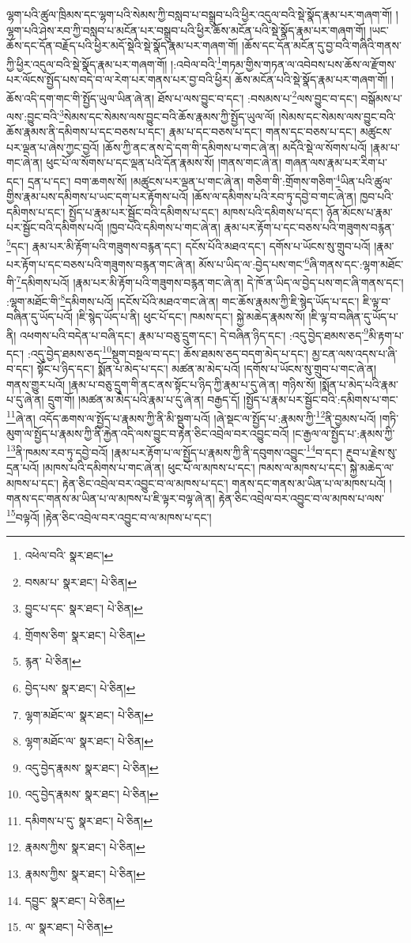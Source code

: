 ལྷག་པའི་ཚུལ་ཁྲིམས་དང་ལྷག་པའི་སེམས་ཀྱི་བསླབ་པ་བསྒྲུབ་པའི་ཕྱིར་འདུལ་བའི་སྡེ་སྣོད་རྣམ་པར་གཞག་གོ། །ལྷག་པའི་ཤེས་རབ་ཀྱི་བསླབ་པ་མངོན་པར་བསྒྲུབ་པའི་ཕྱིར་ཆོས་མངོན་པའི་སྡེ་སྣོད་རྣམ་པར་གཞག་གོ། །ཡང་ཆོས་དང་དོན་བརྗོད་པའི་ཕྱིར་མདོ་སྡེའི་སྡེ་སྣོད་རྣམ་པར་གཞག་གོ། །ཆོས་དང་དོན་མངོན་དུ་བྱ་བའི་གཞིའི་གནས་ཀྱི་ཕྱིར་འདུལ་བའི་སྡེ་སྣོད་རྣམ་པར་གཞག་གོ། །:འབེལ་བའི་\footnote{འཕེལ་བའི་  སྣར་ཐང་། }གཏམ་གྱིས་གཏན་ལ་འབེབས་པས་ཆོས་ལ་རྫོགས་པར་ལོངས་སྤྱོད་པས་བདེ་བ་ལ་རེག་པར་གནས་པར་བྱ་བའི་ཕྱིར། ཆོས་མངོན་པའི་སྡེ་སྣོད་རྣམ་པར་གཞག་གོ། །ཆོས་འདི་དག་གང་གི་སྤྱོད་ཡུལ་ཡིན་ཞེ་ན། ཐོས་པ་ལས་བྱུང་བ་དང་། :བསམས་པ་\footnote{བསམ་པ་  སྣར་ཐང་།  པེ་ཅིན། }ལས་བྱུང་བ་དང་། བསྒོམས་པ་ལས་:བྱུང་བའི་\footnote{བྱུང་པ་དང་  སྣར་ཐང་།  པེ་ཅིན། }སེམས་དང་སེམས་ལས་བྱུང་བའི་ཆོས་རྣམས་ཀྱི་སྤྱོད་ཡུལ་ལོ། །སེམས་དང་སེམས་ལས་བྱུང་བའི་ཆོས་རྣམས་ནི་དམིགས་པ་དང་བཅས་པ་དང་། རྣམ་པ་དང་བཅས་པ་དང་། གནས་དང་བཅས་པ་དང་། མཚུངས་པར་ལྡན་པ་ཞེས་ཀྱང་བྱའོ། །ཆོས་ཀྱི་ནང་ནས་དེ་དག་གི་དམིགས་པ་གང་ཞེ་ན། མདོའི་སྡེ་ལ་སོགས་པའོ། །རྣམ་པ་གང་ཞེ་ན། ཕུང་པོ་ལ་སོགས་པ་དང་ལྡན་པའི་དོན་རྣམས་སོ། །གནས་གང་ཞེ་ན། གཞན་ལས་རྣམ་པར་རིག་པ་དང་། དྲན་པ་དང་། བག་ཆགས་སོ། །མཚུངས་པར་ལྡན་པ་གང་ཞེ་ན། གཅིག་གི་:གྲོགས་གཅིག་\footnote{གྲོགས་ཅིག་  སྣར་ཐང་།  པེ་ཅིན། }ཡིན་པའི་ཚུལ་གྱིས་རྣམ་པས་དམིགས་པ་ཡང་དག་པར་རྟོགས་པའོ། །ཆོས་ལ་དམིགས་པའི་རབ་ཏུ་དབྱེ་བ་གང་ཞེ་ན། ཁྱབ་པའི་དམིགས་པ་དང་། སྤྱོད་པ་རྣམ་པར་སྦྱོང་བའི་དམིགས་པ་དང་། མཁས་པའི་དམིགས་པ་དང་། ཉོན་མོངས་པ་རྣམ་པར་སྦྱོང་བའི་དམིགས་པའོ། །ཁྱབ་པའི་དམིགས་པ་གང་ཞེ་ན། རྣམ་པར་རྟོག་པ་དང་བཅས་པའི་གཟུགས་བརྙན་\footnote{རྙན་  པེ་ཅིན། }དང་། རྣམ་པར་མི་རྟོག་པའི་གཟུགས་བརྙན་དང་། དངོས་པོའི་མཐའ་དང་། དགོས་པ་ཡོངས་སུ་གྲུབ་པའོ། །རྣམ་པར་རྟོག་པ་དང་བཅས་པའི་གཟུགས་བརྙན་གང་ཞེ་ན། མོས་པ་ཡིད་ལ་:བྱེད་པས་གང་\footnote{བྱེད་པས་  སྣར་ཐང་།  པེ་ཅིན། }ཞི་གནས་དང་:ལྷག་མཐོང་གི་\footnote{ལྷག་མཐོང་ལ་  སྣར་ཐང་།  པེ་ཅིན། }དམིགས་པའོ། །རྣམ་པར་མི་རྟོག་པའི་གཟུགས་བརྙན་གང་ཞེ་ན། དེ་ཁོ་ན་ཡིད་ལ་བྱེད་པས་གང་ཞི་གནས་དང་། :ལྷག་མཐོང་གི་\footnote{ལྷག་མཐོང་ལ་  སྣར་ཐང་།  པེ་ཅིན། }དམིགས་པའོ། །དངོས་པོའི་མཐའ་གང་ཞེ་ན། གང་ཆོས་རྣམས་ཀྱི་ཇི་སྙེད་ཡོད་པ་དང་། ཇི་ལྟ་བ་བཞིན་དུ་ཡོད་པའོ། །ཇི་སྙེད་ཡོད་པ་ནི། ཕུང་པོ་དང་། ཁམས་དང་། སྐྱེ་མཆེད་རྣམས་སོ། །ཇི་ལྟ་བ་བཞིན་དུ་ཡོད་པ་ནི། འཕགས་པའི་བདེན་པ་བཞི་དང་། རྣམ་པ་བཅུ་དྲུག་དང་། དེ་བཞིན་ཉིད་དང་། :འདུ་བྱེད་ཐམས་ཅད་\footnote{འདུ་བྱེད་རྣམས་  སྣར་ཐང་།  པེ་ཅིན། }མི་རྟག་པ་དང་། :འདུ་བྱེད་ཐམས་ཅད་\footnote{འདུ་བྱེད་རྣམས་  སྣར་ཐང་།  པེ་ཅིན། }སྡུག་བསྔལ་བ་དང་། ཆོས་ཐམས་ཅད་བདག་མེད་པ་དང་། མྱ་ངན་ལས་འདས་པ་ཞི་བ་དང་། སྟོང་པ་ཉིད་དང་། སྨོན་པ་མེད་པ་དང་། མཚན་མ་མེད་པའོ། །དགོས་པ་ཡོངས་སུ་གྲུབ་པ་གང་ཞེ་ན། གནས་གྱུར་པའོ། །རྣམ་པ་བཅུ་དྲུག་གི་ནང་ནས་སྟོང་པ་ཉིད་ཀྱི་རྣམ་པ་དུ་ཞེ་ན། གཉིས་སོ། །སྨོན་པ་མེད་པའི་རྣམ་པ་དུ་ཞེ་ན། དྲུག་གོ། །མཚན་མ་མེད་པའི་རྣམ་པ་དུ་ཞེ་ན། བརྒྱད་དོ། །སྤྱོད་པ་རྣམ་པར་སྦྱོང་བའི་:དམིགས་པ་གང་\footnote{དམིགས་པ་དུ་  སྣར་ཐང་།  པེ་ཅིན། }ཞེ་ན། འདོད་ཆགས་ལ་སྤྱོད་པ་རྣམས་ཀྱི་ནི་མི་སྡུག་པའོ། །ཞེ་སྡང་ལ་སྤྱོད་པ་:རྣམས་ཀྱི་\footnote{རྣམས་ཀྱིས་  སྣར་ཐང་།  པེ་ཅིན། }ནི་བྱམས་པའོ། །གཏི་མུག་ལ་སྤྱོད་པ་རྣམས་ཀྱི་ནི་རྐྱེན་འདི་ལས་བྱུང་བ་རྟེན་ཅིང་འབྲེལ་བར་འབྱུང་བའོ། །ང་རྒྱལ་ལ་སྤྱོད་པ་:རྣམས་ཀྱི་\footnote{རྣམས་ཀྱིས་  སྣར་ཐང་།  པེ་ཅིན། }ནི་ཁམས་རབ་ཏུ་དབྱེ་བའོ། །རྣམ་པར་རྟོག་པ་ལ་སྤྱོད་པ་རྣམས་ཀྱི་ནི་དབུགས་འབྱུང་\footnote{དབྱུང་  སྣར་ཐང་།  པེ་ཅིན། }བ་དང་། རྔུབ་པ་རྗེས་སུ་དྲན་པའོ། །མཁས་པའི་དམིགས་པ་གང་ཞེ་ན། ཕུང་པོ་ལ་མཁས་པ་དང་། ཁམས་ལ་མཁས་པ་དང་། སྐྱེ་མཆེད་ལ་མཁས་པ་དང་། རྟེན་ཅིང་འབྲེལ་བར་འབྱུང་བ་ལ་མཁས་པ་དང་། གནས་དང་གནས་མ་ཡིན་པ་ལ་མཁས་པའོ། །གནས་དང་གནས་མ་ཡིན་པ་ལ་མཁས་པ་ཇི་ལྟར་བལྟ་ཞེ་ན། རྟེན་ཅིང་འབྲེལ་བར་འབྱུང་བ་ལ་མཁས་པ་ལས་\footnote{ལ་  སྣར་ཐང་།  པེ་ཅིན། }བལྟའོ། །རྟེན་ཅིང་འབྲེལ་བར་འབྱུང་བ་ལ་མཁས་པ་དང་། 